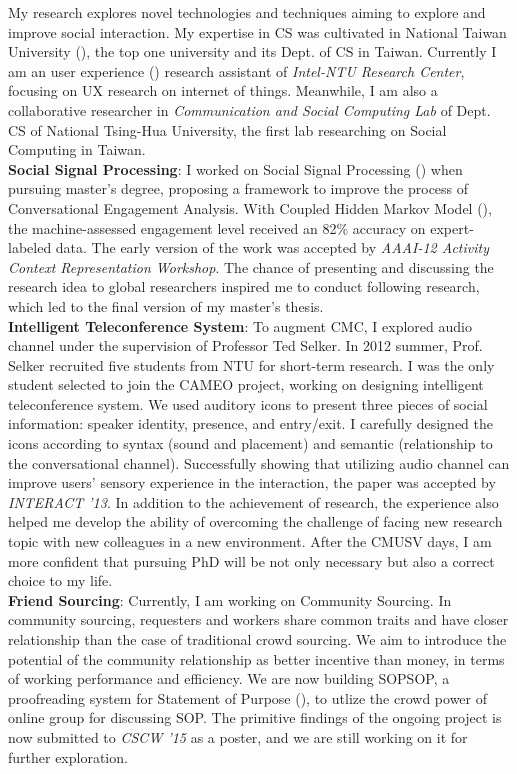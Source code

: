 \noindent
My research explores novel technologies and techniques aiming to explore and improve social interaction. %
My expertise in CS was cultivated in National Taiwan University (),
the top one university and its Dept. of CS in Taiwan. 
Currently I am an user experience () research assistant of \textit{Intel-NTU Research Center}, 
focusing on UX research on internet of things.
Meanwhile, 
I am also a collaborative researcher in \textit{Communication and Social Computing Lab} of Dept. CS of National Tsing-Hua University,
the first lab researching on Social Computing in Taiwan.\\

\noindent
\textbf{Social Signal Processing}:
I worked on Social Signal Processing () when pursuing master's degree, 
proposing a framework to improve the process of Conversational Engagement Analysis. 
With Coupled Hidden Markov Model (), 
the machine-assessed engagement level received an 82\% accuracy on expert-labeled data. 
The early version of the work was accepted by \textit{AAAI-12 Activity Context Representation Workshop}. 
The chance of presenting and discussing the research idea to global researchers inspired me to conduct following research, 
which led to the final version of my master’s thesis.\\

\noindent
\textbf{Intelligent Teleconference System}:
To augment CMC, I explored audio channel under the supervision of Professor Ted Selker. 
In 2012 summer, Prof. Selker recruited five students from NTU for short-term research.
I was the only student selected to join the CAMEO project, working on designing intelligent teleconference system. 
We used auditory icons to present three pieces of social information: speaker identity, presence, and entry/exit. 
I carefully designed the icons according to syntax (sound and placement) and semantic (relationship to the conversational channel). 
Successfully showing that utilizing audio channel can improve users' sensory experience in the interaction, 
the paper was accepted by \textit{INTERACT '13}. 
In addition to the achievement of research, 
the experience also helped me develop the ability of overcoming the challenge of facing new research topic with new colleagues in a new environment. 
After the CMUSV days, I am more confident that pursuing PhD will be not only necessary but also a correct choice to my life.\\

\noindent
\textbf{Friend Sourcing}:
Currently, I am working on Community Sourcing.
In community sourcing, 
requesters and workers share common traits and have closer relationship than the case of traditional crowd sourcing.
We aim to introduce the potential of the community relationship as better incentive than money,
in terms of working performance and efficiency.
We are now building SOPSOP, a proofreading system for Statement of Purpose (), 
to utlize the crowd power of online group for discussing SOP.
The primitive findings of the ongoing project is now submitted to \textit{CSCW '15} as a poster,
and we are still working on it for further exploration. \\




